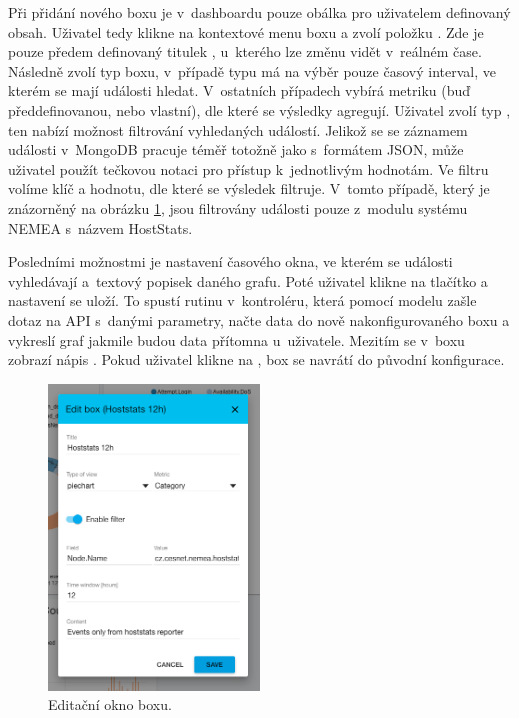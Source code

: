 Při přidání nového boxu je v~dashboardu pouze obálka pro uživatelem definovaný obsah. Uživatel tedy klikne na kontextové menu boxu a zvolí položku . Zde je pouze předem definovaný titulek , u~kterého lze změnu vidět v~reálném čase. Následně zvolí typ boxu, v~případě typu  má na výběr pouze časový interval, ve kterém se mají události hledat. V~ostatních případech vybírá metriku (buď předdefinovanou, nebo vlastní), dle které se výsledky agregují. Uživatel zvolí typ , ten nabízí možnost filtrování vyhledaných událostí. Jelikož se se záznamem události v~MongoDB pracuje téměř totožně jako s~formátem JSON, může uživatel použít tečkovou notaci pro přístup k~jednotlivým hodnotám. Ve filtru volíme klíč a hodnotu, dle které se výsledek filtruje. V~tomto případě, který je znázorněný na obrázku \ref{fig:box_edit}, jsou filtrovány události pouze z~modulu systému NEMEA s~názvem HostStats.

Posledními možnostmi je nastavení časového okna, ve kterém se události vyhledávají a~textový popisek daného grafu. Poté uživatel klikne na tlačítko  a nastavení se uloží. To spustí rutinu v~kontroléru, která pomocí modelu zašle dotaz na API s~danými parametry, načte data do nově nakonfigurovaného boxu a vykreslí graf jakmile budou data přítomna u~uživatele. Mezitím se v~boxu zobrazí nápis . Pokud uživatel klikne na , box se navrátí do původní konfigurace.

\begin{figure}[ht]
    \centering
    \includegraphics[width=0.5\textwidth]{fig/box_edit.png}
    \caption{Editační okno boxu.} \label{fig:box_edit}
\end{figure}

